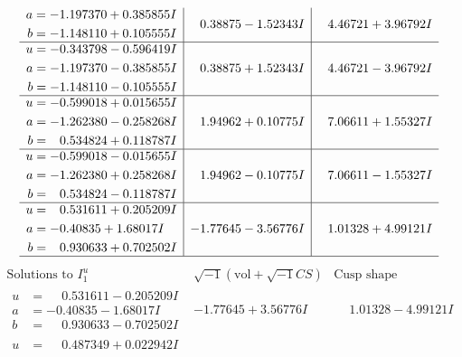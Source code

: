 \documentclass[1p]{elsarticle_modified}
\theoremstyle{definition}
\newcommand{\I}{\sqrt{-1}}
\begin{document}
$$\begin{array}{c|c|c}
\begin{aligned}
a &= -1.197370 + 0.385855 I \\
b &= -1.148110 + 0.105555 I\end{aligned}
 & \phantom{-}0.38875 - 1.52343 I & \phantom{-}4.46721 + 3.96792 I \\ \hline\begin{aligned}
u &= -0.343798 - 0.596419 I \\
a &= -1.197370 - 0.385855 I \\
b &= -1.148110 - 0.105555 I\end{aligned}
 & \phantom{-}0.38875 + 1.52343 I & \phantom{-}4.46721 - 3.96792 I \\ \hline\begin{aligned}
u &= -0.599018 + 0.015655 I \\
a &= -1.262380 - 0.258268 I \\
b &= \phantom{-}0.534824 + 0.118787 I\end{aligned}
 & \phantom{-}1.94962 + 0.10775 I & \phantom{-}7.06611 + 1.55327 I \\ \hline\begin{aligned}
u &= -0.599018 - 0.015655 I \\
a &= -1.262380 + 0.258268 I \\
b &= \phantom{-}0.534824 - 0.118787 I\end{aligned}
 & \phantom{-}1.94962 - 0.10775 I & \phantom{-}7.06611 - 1.55327 I \\ \hline\begin{aligned}
u &= \phantom{-}0.531611 + 0.205209 I \\
a &= -0.40835 + 1.68017 I \\
b &= \phantom{-}0.930633 + 0.702502 I\end{aligned}
 & -1.77645 - 3.56776 I & \phantom{-}1.01328 + 4.99121 I\\
 \hline 
 \end{array}$$\newpage$$\begin{array}{c|c|c}  
\text{Solutions to }I^u_{1}& \I (\text{vol} + \sqrt{-1}CS) & \text{Cusp shape}\\
 \hline 
\begin{aligned}
u &= \phantom{-}0.531611 - 0.205209 I \\
a &= -0.40835 - 1.68017 I \\
b &= \phantom{-}0.930633 - 0.702502 I\end{aligned}
 & -1.77645 + 3.56776 I & \phantom{-}1.01328 - 4.99121 I \\ \hline\begin{aligned}
u &= \phantom{-}0.487349 + 0.022942 I \\

\end{aligned}
\end{array}$$
\end{document}
